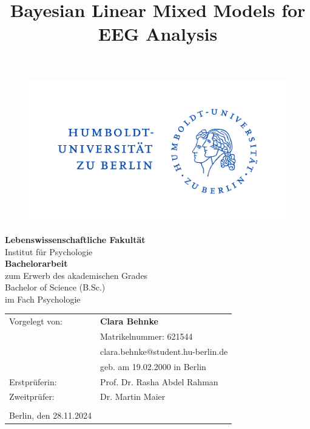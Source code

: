 \documentclass[
  doc,12pt,floatsintext]{apa7}
\title{Bayesian Linear Mixed Models for EEG Analysis}
\author{\phantom{0}}
\date{}
\affiliation{\phantom{0}}
\begin{document}
\maketitle

\vspace{-20mm}
\begin{center}
\begin{figure}[h]
\begin{center}
\includegraphics[width=!,totalheight=!,scale=0.2]{auxiliary_files/hu_logo}
\end{center}
\end{figure}
\vspace*{5mm}
{
\textbf{Lebenswissenschaftliche Fakultät}\\
Institut für Psychologie\\
\vspace*{10mm}
}
{
\textbf{Bachelorarbeit}\\
zum Erwerb des akademischen Grades \\
Bachelor of Science (B.Sc.)\\
im Fach Psychologie\\
\vspace*{10mm}
}
\end{center}
\begin{flushleft}
{
\begin{tabular}{ll}
Vorgelegt von:&\textbf{Clara Behnke}\\
&Matrikelnummer: 621544\\
&clara.behnke$@$student.hu-berlin.de\\
&geb. am 19.02.2000 in Berlin\\
Erstprüferin:&Prof. Dr. Rasha Abdel Rahman\\
Zweitprüfer:&Dr. Martin Maier\\
&\\
Berlin, den 28.11.2024&\\
\end{tabular}
}
\end{flushleft}
\end{document}
